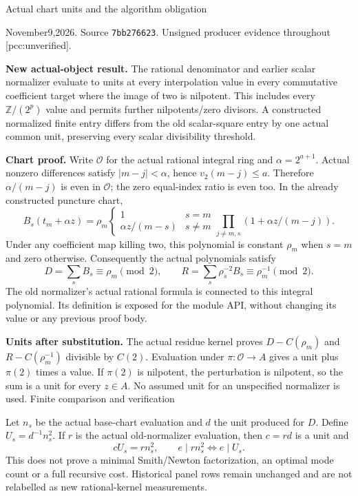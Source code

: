 \documentclass[11pt]{article}
\begin{document}
{\LARGE Actual chart units and the algorithm obligation}\par
November9,2026. Source \texttt{7bb276623}. Unsigned producer evidence
throughout [pcc:unverified].

\textbf{New actual-object result.} The rational denominator and earlier scalar
normalizer evaluate to units at every interpolation value in every commutative
coefficient target where the image of two is nilpotent. This includes every
$\mathbb Z/(2^p)$ value and permits further nilpotents/zero divisors. A constructed
normalized finite entry differs from the old scalar-square entry by one actual
common unit, preserving every scalar divisibility threshold.

\textbf{Chart proof.} Write $\mathcal O$ for the actual rational integral ring
and $\alpha=2^{a+1}$. Actual nonzero differences satisfy $|m-j|<\alpha$, hence
$v_2(m-j)\leq a$. Therefore $\alpha/(m-j)$ is even in $\mathcal O$; the
zero equal-index ratio is even too. In the already constructed puncture chart,
\[
 B_s(t_m+\alpha z)=\rho_m
  \begin{cases}1&s=m\\ \alpha z/(m-s)&s\ne m\end{cases}
  \prod_{j\ne m,s}(1+\alpha z/(m-j)).
\]
Under any coefficient map killing two, this polynomial is constant $\rho_m$
when $s=m$ and zero otherwise. Consequently the actual polynomials satisfy
\[
 D=\sum_s B_s\equiv\rho_m\pmod2,\qquad
 R=\sum_s\rho_s^{-2}B_s\equiv\rho_m^{-1}\pmod2.
\]
The old normalizer's actual rational formula is connected to this integral
polynomial. Its definition is exposed for the module API, without changing
its value or any previous proof body.

\textbf{Units after substitution.} The actual residue kernel proves
$D-C(\rho_m)$ and $R-C(\rho_m^{-1})$ divisible by $C(2)$. Evaluation under
$\pi:\mathcal O\to A$ gives a unit plus $\pi(2)$ times a value. If $\pi(2)$
is nilpotent, the perturbation is nilpotent, so the sum is a unit for every
$z\in A$. No assumed unit for an unspecified normalizer is used.
\newpage
{\Large Finite comparison and verification}\par
Let $n_s$ be the actual base-chart evaluation and $d$ the unit produced for
$D$. Define $U_s=d^{-1}n_s^2$. If $r$ is the actual old-normalizer evaluation,
then $c=rd$ is a unit and
\[
 cU_s=rn_s^2,\qquad e\mid rn_s^2\iff e\mid U_s.
\]
This does not prove a minimal Smith/Newton factorization, an optimal mode count
or a full recursive cost. Historical panel rows remain unchanged and are not
relabelled as new rational-kernel measurements.
\end{document}
